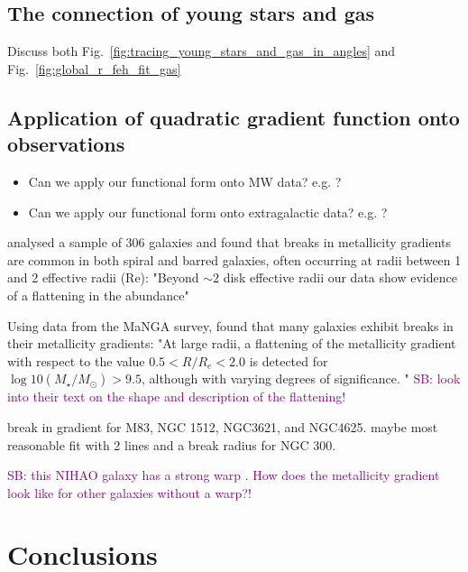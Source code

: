 \documentclass[fleqn,usenatbib]{mnras}
\newcommand{\SB}[1]{{\textcolor{purple}{SB: #1}}}
\begin{document}
\subsection{The connection of young stars and gas}

Discuss both Fig.~\ref{fig:tracing_young_stars_and_gas_in_angles} and Fig.~\ref{fig:global_r_feh_fit_gas}

\subsection{Application of quadratic gradient function onto observations}

\begin{itemize}
    \item Can we apply our functional form onto MW data? e.g. \citet{Yong2012, Andrievsky2004, Genovali2014}?
    \item Can we apply our functional form onto extragalactic data? e.g. \citet{Chen2023, Bresolin2012}?
\end{itemize}

\citet{Sanchez2014} analysed a sample of 306 galaxies and found that breaks in metallicity gradients are common in both spiral and barred galaxies, often occurring at radii between 1 and 2 effective radii (Re): "Beyond $\sim 2$ disk effective radii our data show evidence of a flattening in the abundance"

Using data from the MaNGA survey, \citet{Belfiore2017} found that many galaxies exhibit breaks in their metallicity gradients: "At large radii, a flattening of the metallicity gradient with respect to the value $0.5 < R/R_e < 2.0$ is detected for $\log10(M_\star/M_\odot) > 9.5$, although with varying degrees of significance. " \SB{look into their text on the shape and description of the flattening!}

\citet{Bresolin2012} break in gradient for M83, NGC 1512, NGC3621, and NGC4625.
\citet{Vlajic2009} maybe most reasonable fit with 2 lines and a break radius for NGC 300.

\SB{this NIHAO galaxy has a strong warp \citep[compared to other NIHAO-UHD simulations][]{Buck2020}. How does the metallicity gradient look like for other galaxies without a warp?!}

\section{Conclusions}
\label{sec:conc}
\end{document}
